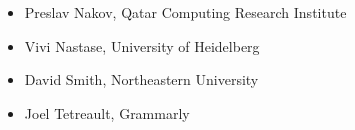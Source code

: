 \begin{itemize}[itemsep=7pt, leftmargin=0cm, label={}]
\begin{itemize}[leftmargin=0.5cm, itemsep=6pt, label={}]
\begin{itemize}[nosep, leftmargin=0.5cm, label={}]
\item  Preslav Nakov, Qatar Computing Research Institute  
\item    Vivi Nastase, University of Heidelberg  
\item    David Smith, Northeastern University  
\item    Joel Tetreault, Grammarly 
\end{itemize}



\end{itemize}



\end{itemize}
\clearpage{}


%
%
%
%
%

